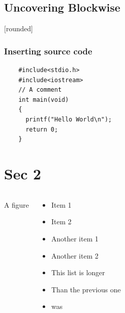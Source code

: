 \documentclass{beamer}
\newcommand\Fontvi{\fontsize{6}{7.2}\selectfont}
\begin{document}
\subsection{Uncovering Blockwise}
[rounded]
\begin{frame}[fragile]
\frametitle{Inserting source code}
\Fontvi
{}
\begin{block}{}
\begin{lstlisting}
    #include<stdio.h>
    #include<iostream>
    // A comment
    int main(void)
    {
      printf("Hello World\n");
      return 0;
    }
\end{lstlisting}
\end{block}
\end{frame}

\section{Sec 2}

\begin{frame}

   \begin{columns}
          A figure
        \begin{overprint}
          \begin{itemize}
              \item Item 1
              \item Item 2
          \end{itemize}
          \begin{itemize}
              \item Another item 1
              \item Another item 2
              \item This list is longer
              \item Than the previous one
              \item was
          \end{itemize}
        \end{overprint}
      \end{columns}

\end{frame}
\end{document}
